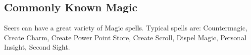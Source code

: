\subsection{Commonly Known Magic}
Seers can have a great variety of Magic spells. Typical spells are: Countermagic, Create Charm, Create Power Point Store, Create Scroll, Dispel Magic, Personal Insight, Second Sight.


%
%
%


